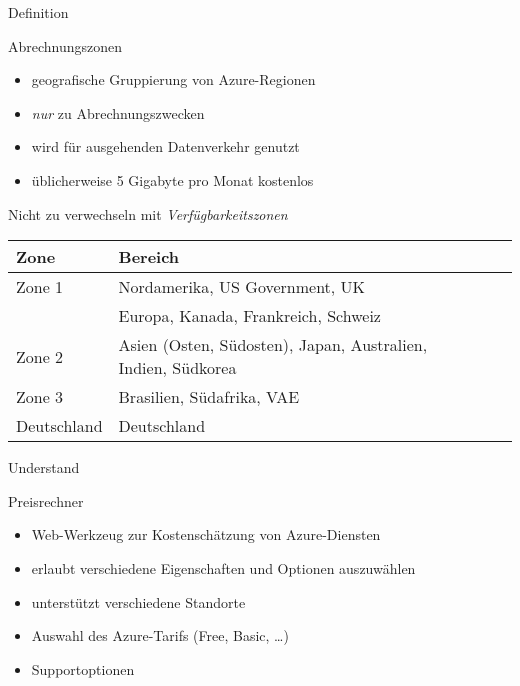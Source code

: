 \documentclass{scrartcl}
\newenvironment{flashcard}[2][]{%
    #1
    \vfill
    \centerline{\Large{#2}}
    \vfill
\newpage
}
{\newpage}
\begin{document}
    \begin{flashcard}[Definition]{Abrechnungszonen}
        \begin{itemize}
            \item geografische Gruppierung von Azure-Regionen
            \item \emph{nur} zu Abrechnungszwecken
            \item wird für ausgehenden Datenverkehr genutzt
            \item üblicherweise 5 Gigabyte pro Monat kostenlos
        \end{itemize}
        Nicht zu verwechseln mit \emph{Verfügbarkeitszonen}

        \begin{tabular}{l|lll}
            Zone        &  Bereich\\
            \hline
            Zone 1      &  Nordamerika, US Government, UK\\
                        & Europa, Kanada, Frankreich, Schweiz\\
            Zone 2      &  Asien (Osten, Südosten), Japan, Australien, Indien, Südkorea\\
            Zone 3      &  Brasilien, Südafrika, VAE\\
            Deutschland & Deutschland\\
        \end{tabular}

    \end{flashcard}

    \begin{flashcard}[Understand]{Preisrechner}
        \begin{itemize}
            \item Web-Werkzeug zur Kostenschätzung von Azure-Diensten
            \item erlaubt verschiedene Eigenschaften und Optionen auszuwählen
            \item unterstützt verschiedene Standorte
            \item Auswahl des Azure-Tarifs (Free, Basic, \ldots)
            \item Supportoptionen
        \end{itemize}

    \end{flashcard}
\end{document}
